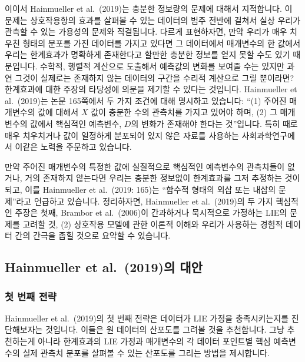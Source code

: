 \documentclass[
]{book}
\begin{document}
이이서 Hainmueller et al.~(2019)는 충분한 정보량의 문제에 대해서 지적합니다. 이 문제는 상호작용항의 효과를 살펴볼 수 있는 데이터의 범주 전반에 걸쳐서 실상 우리가 관측할 수 있는 가용성의 문제와 직결됩니다. 다르게 표현하자면, 만약 우리가 매우 치우친 형태의 분포를 가진 데이터를 가지고 있다면 그 데이터에서 매개변수의 한 값에서 우리는 한계효과가 명확하게 존재한다고 할만한 충분한 정보를 얻지 못할 수도 있기 때문입니다. 수학적, 행렬적 계산으로 도출해서 예측값의 변화를 보여줄 수는 있지만 과연 그것이 실제로는 존재하지 않는 데이터의 구간을 수리적 계산으로 그릴 뿐이라면? 한계효과에 대한 주장의 타당성에 의문을 제기할 수 있다는 것입니다. Hainmueller et al.~(2019)는 논문 165쪽에서 두 가지 조건에 대해 명시하고 있습니다: ``(1) 주어진 매개변수의 값에 대해서 \(X\) 값이 충분한 수의 관측치를 가지고 있어야 하며, (2) 그 매개변수의 값에서 핵심적인 예측변수, \(D\)의 변화가 존재해야 한다는 것''입니다. 특히 때로 매우 치우치거나 값이 일정하게 분포되어 있지 않은 자료를 사용하는 사회과학연구에서 이같은 노력을 주문하고 있습니다.

만약 주어진 매개변수의 특정한 값에 실질적으로 핵심적인 예측변수의 관측치들이 없거나, 거의 존재하지 않는다면 우리는 충분한 정보없이 한계효과를 그저 추정하는 것이 되고, 이를 Hainmueller et al.~(2019: 165)는 ``함수적 형태의 외삽 또는 내삽의 문제''라고 언급하고 있습니다. 정리하자면, Hainmueller et al.~(2019)의 두 가지 핵심적인 주장은 첫째, Brambor et al.~(2006)이 간과하거나 묵시적으로 가정하는 LIE의 문제를 고려할 것, (2) 상호작용 모델에 관한 이론적 이해와 우리가 사용하는 경험적 데이터 간의 간극을 좁힐 것으로 요약할 수 있습니다.

\hypertarget{hainmueller-et-al.-2019uxc758-uxb300uxc548}{%
\subsection{Hainmueller et al.~(2019)의 대안}\label{hainmueller-et-al.-2019uxc758-uxb300uxc548}}

\hypertarget{uxccab-uxbc88uxc9f8-uxc804uxb7b5}{%
\subsubsection{첫 번째 전략}\label{uxccab-uxbc88uxc9f8-uxc804uxb7b5}}

Hainmueller et al.~(2019)의 첫 번째 전략은 데이터가 LIE 가정을 충족시키는지를 진단해보자는 것입니다. 이들은 원 데이터의 산포도를 그려볼 것을 추천합니다. 그냥 추천하는게 아니라 한계효과의 LIE 가정과 매개변수의 각 데이터 포인트별 핵심 예측변수의 실제 관측치 분포를 살펴볼 수 있는 산포도를 그리는 방법을 제시합니다.
\end{document}
